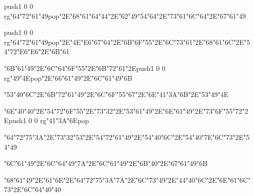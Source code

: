 \vfill\eject
\null\vfill
\centerline{\pdfcolorstack\match push{1 0 0 rg}\ipa\char"64\ipa\char"72\ipa\char"61\ipa\char"49\pdfcolorstack\match pop{}\ipa\char"2E\ipa\char"68\ipa\char"61\ipa\char"64\ipa\char"44\ipa\char"2E\ipa\char"62\ipa\char"49\ipa\char"54\ipa\char"64\ipa\char"2E\ipa\char"73\ipa\char"61\ipa\char"6C\ipa\char"64\ipa\char"2E\ipa\char"67\ipa\char"61\ipa\char"49}\bigskip
\centerline{\pdfcolorstack\match push{1 0 0 rg}\ipa\char"64\ipa\char"72\ipa\char"61\ipa\char"49\pdfcolorstack\match pop{}\ipa\char"2E\ipa\char"4E\ipa\char"E6\ipa\char"67\ipa\char"64\ipa\char"2E\ipa\char"6B\ipa\char"6F\ipa\char"55\ipa\char"2E\ipa\char"6C\ipa\char"73\ipa\char"61\ipa\char"2E\ipa\char"68\ipa\char"61\ipa\char"6C\ipa\char"2E\ipa\char"54\ipa\char"72\ipa\char"E6\ipa\char"E6\ipa\char"2E\ipa\char"6B\ipa\char"61}\bigskip
\centerline{\ipa\char"6B\ipa\char"61\ipa\char"49\ipa\char"2E\ipa\char"6C\ipa\char"64\ipa\char"6F\ipa\char"55\ipa\char"2E\ipa\char"6B\ipa\char"72\ipa\char"61\ipa\char"2E\pdfcolorstack\match push{1 0 0 rg}\ipa\char"49\ipa\char"4E\pdfcolorstack\match pop{}\ipa\char"2E\ipa\char"66\ipa\char"61\ipa\char"49\ipa\char"2E\ipa\char"6C\ipa\char"61\ipa\char"49\ipa\char"6B}
\vfill\eject
\null\vfill
\centerline{\ipa\char"53\ipa\char"40\ipa\char"6C\ipa\char"2E\ipa\char"6B\ipa\char"72\ipa\char"61\ipa\char"49\ipa\char"2E\ipa\char"6C\ipa\char"6F\ipa\char"55\ipa\char"67\ipa\char"2E\ipa\char"6E\ipa\char"41\ipa\char"3A\ipa\char"6B\ipa\char"2E\ipa\char"53\ipa\char"49\ipa\char"4E}\bigskip
\centerline{\ipa\char"6E\ipa\char"40\ipa\char"40\ipa\char"2E\ipa\char"54\ipa\char"72\ipa\char"6F\ipa\char"55\ipa\char"2E\ipa\char"73\ipa\char"32\ipa\char"2E\ipa\char"53\ipa\char"61\ipa\char"49\ipa\char"2E\ipa\char"6E\ipa\char"61\ipa\char"49\ipa\char"2E\ipa\char"73\ipa\char"6F\ipa\char"55\ipa\char"72\ipa\char"2E\pdfcolorstack\match push{1 0 0 rg}\ipa\char"41\ipa\char"3A\ipa\char"6E\pdfcolorstack\match pop{}}\bigskip
\centerline{\ipa\char"64\ipa\char"72\ipa\char"75\ipa\char"3A\ipa\char"2E\ipa\char"73\ipa\char"32\ipa\char"53\ipa\char"2E\ipa\char"54\ipa\char"72\ipa\char"61\ipa\char"49\ipa\char"2E\ipa\char"54\ipa\char"40\ipa\char"6C\ipa\char"2E\ipa\char"54\ipa\char"40\ipa\char"7E\ipa\char"6C\ipa\char"73\ipa\char"2E\ipa\char"54\ipa\char"49}
\vfill\eject
\null\vfill
\centerline{\ipa\char"6C\ipa\char"61\ipa\char"49\ipa\char"2E\ipa\char"6C\ipa\char"64\ipa\char"49\ipa\char"7A\ipa\char"2E\ipa\char"6C\ipa\char"61\ipa\char"49\ipa\char"2E\ipa\char"6B\ipa\char"40\ipa\char"2E\ipa\char"67\ipa\char"61\ipa\char"49\ipa\char"6B}\bigskip
\centerline{\ipa\char"68\ipa\char"61\ipa\char"49\ipa\char"2E\ipa\char"61\ipa\char"6E\ipa\char"2E\ipa\char"64\ipa\char"72\ipa\char"75\ipa\char"3A\ipa\char"7A\ipa\char"2E\ipa\char"6C\ipa\char"73\ipa\char"49\ipa\char"2E\ipa\char"44\ipa\char"40\ipa\char"6C\ipa\char"2E\ipa\char"6E\ipa\char"61\ipa\char"6C\ipa\char"73\ipa\char"2E\ipa\char"6C\ipa\char"64\ipa\char"40\ipa\char"40}\bigskip
